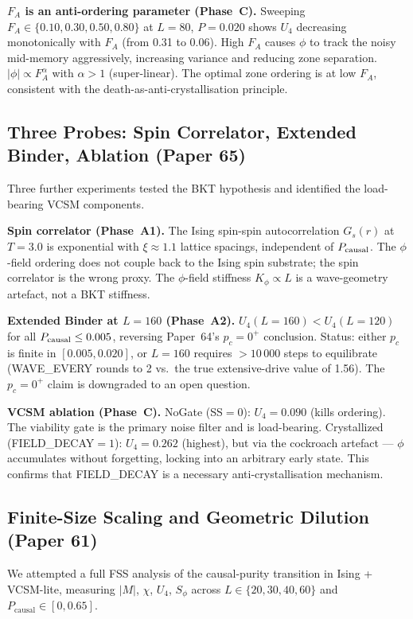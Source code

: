 \documentclass[11pt]{article}
\begin{document}
\textbf{$F_A$ is an anti-ordering parameter (Phase~C).}
Sweeping $F_A \in \{0.10, 0.30, 0.50, 0.80\}$ at $L=80$, $P=0.020$ shows
$U_4$ decreasing monotonically with $F_A$ (from 0.31 to 0.06).
High $F_A$ causes $\phi$ to track the noisy mid-memory aggressively,
increasing variance and reducing zone separation.
$|\phi| \propto F_A^\alpha$ with $\alpha > 1$ (super-linear).
The optimal zone ordering is at low $F_A$, consistent with the
death-as-anti-crystallisation principle.

\subsection{Three Probes: Spin Correlator, Extended Binder, Ablation (Paper 65)}

Three further experiments tested the BKT hypothesis and identified
the load-bearing VCSM components.

\textbf{Spin correlator (Phase~A1).}
The Ising spin-spin autocorrelation $G_s(r)$ at $T=3.0$ is exponential
with $\xi \approx 1.1$ lattice spacings, independent of $P_{\rm causal}$.
The $\phi$-field ordering does not couple back to the Ising spin substrate;
the spin correlator is the wrong proxy.
The $\phi$-field stiffness $K_\phi \propto L$ is a wave-geometry artefact,
not a BKT stiffness.

\textbf{Extended Binder at $L=160$ (Phase~A2).}
$U_4(L=160) < U_4(L=120)$ for all $P_{\rm causal} \leq 0.005$,
reversing Paper~64's $p_c = 0^+$ conclusion.
Status: either $p_c$ is finite in $[0.005, 0.020]$,
or $L=160$ requires $>10\,000$ steps to equilibrate (WAVE\_EVERY rounds to 2
vs.\ the true extensive-drive value of 1.56).
The $p_c = 0^+$ claim is downgraded to an open question.

\textbf{VCSM ablation (Phase~C).}
NoGate (SS$=0$): $U_4 = 0.090$ (kills ordering).
The viability gate is the primary noise filter and is load-bearing.
Crystallized (FIELD\_DECAY$=1$): $U_4 = 0.262$ (highest), but via the
cockroach artefact --- $\phi$ accumulates without forgetting, locking into
an arbitrary early state.
This confirms that FIELD\_DECAY is a necessary anti-crystallisation mechanism.

\subsection{Finite-Size Scaling and Geometric Dilution (Paper 61)}

We attempted a full FSS analysis of the causal-purity transition in Ising + VCSM-lite,
measuring $|M|$, $\chi$, $U_4$, $S_\phi$ across $L \in \{20,30,40,60\}$
and $P_\mathrm{causal} \in [0,0.65]$.
\end{document}
